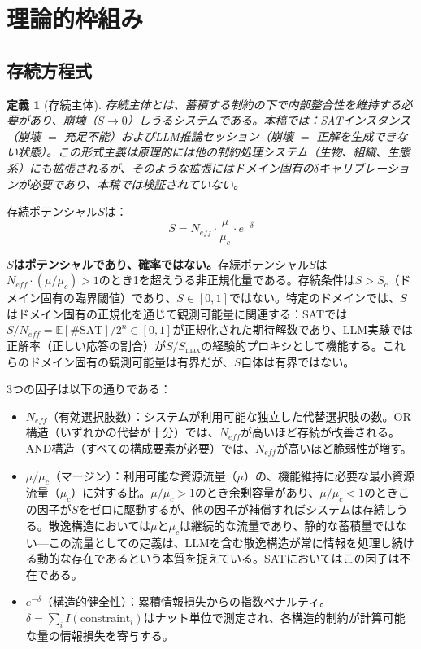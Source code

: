 \documentclass[11pt,a4paper]{article}
\newtheorem{definition}{定義}
\begin{document}
\section{理論的枠組み}
\label{sec:theory}

\subsection{存続方程式}

\begin{definition}[存続主体]
存続主体とは、蓄積する制約の下で内部整合性を維持する必要があり、崩壊（$S \to 0$）しうるシステムである。本稿では：SATインスタンス（崩壊 $=$ 充足不能）およびLLM推論セッション（崩壊 $=$ 正解を生成できない状態）。この形式主義は原理的には他の制約処理システム（生物、組織、生態系）にも拡張されるが、そのような拡張にはドメイン固有の$\delta$キャリブレーションが必要であり、本稿では検証されていない。
\end{definition}

存続ポテンシャル$S$は：
\begin{equation}
S = N_{eff} \cdot \frac{\mu}{\mu_c} \cdot e^{-\delta}
\label{eq:survival-main}
\end{equation}

\textbf{$S$はポテンシャルであり、確率ではない。}存続ポテンシャル$S$は$N_{eff} \cdot (\mu/\mu_c) > 1$のとき1を超えうる非正規化量である。存続条件は$S > S_c$（ドメイン固有の臨界閾値）であり、$S \in [0,1]$ではない。特定のドメインでは、$S$はドメイン固有の正規化を通じて観測可能量に関連する：SATでは$S/N_{eff} = \mathbb{E}[\#\text{SAT}]/2^n \in [0,1]$が正規化された期待解数であり、LLM実験では正解率（正しい応答の割合）が$S/S_{\max}$の経験的プロキシとして機能する。これらのドメイン固有の観測可能量は有界だが、$S$自体は有界ではない。

3つの因子は以下の通りである：
\begin{itemize}
    \item $N_{eff}$（有効選択肢数）：システムが利用可能な独立した代替選択肢の数。OR構造（いずれかの代替が十分）では、$N_{eff}$が高いほど存続が改善される。AND構造（すべての構成要素が必要）では、$N_{eff}$が高いほど脆弱性が増す。
    \item $\mu/\mu_c$（マージン）：利用可能な資源流量（$\mu$）の、機能維持に必要な最小資源流量（$\mu_c$）に対する比。$\mu/\mu_c > 1$のとき余剰容量があり、$\mu/\mu_c < 1$のときこの因子が$S$をゼロに駆動するが、他の因子が補償すればシステムは存続しうる。散逸構造においては$\mu$と$\mu_c$は継続的な流量であり、静的な蓄積量ではない---この流量としての定義は、LLMを含む散逸構造が常に情報を処理し続ける動的な存在であるという本質を捉えている。SATにおいてはこの因子は不在である。
    \item $e^{-\delta}$（構造的健全性）：累積情報損失からの指数ペナルティ。$\delta = \sum_i I(\text{constraint}_i)$はナット単位で測定され、各構造的制約が計算可能な量の情報損失を寄与する。
\end{itemize}
\end{document}
